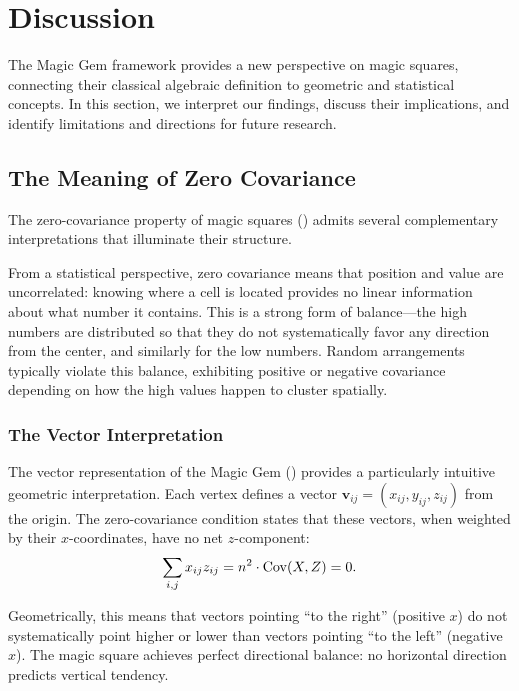 \section{Discussion}
\label{sec:discussion}

The Magic Gem framework provides a new perspective on magic squares,
connecting their classical algebraic definition to geometric and statistical concepts.
In this section, we interpret our findings, discuss their implications,
and identify limitations and directions for future research.

\subsection{The Meaning of Zero Covariance}

The zero-covariance property of magic squares () 
admits several complementary interpretations that illuminate their structure.

From a statistical perspective, zero covariance means that position and value are uncorrelated:
knowing where a cell is located provides no linear information about what number it contains.
This is a strong form of balance---the high numbers are distributed so that they do not systematically 
favor any direction from the center, and similarly for the low numbers.
Random arrangements typically violate this balance, exhibiting positive or negative covariance
depending on how the high values happen to cluster spatially.

\subsubsection{The Vector Interpretation}

The vector representation of the Magic Gem () provides a particularly 
intuitive geometric interpretation.
Each vertex defines a vector $\mathbf{v}_{ij} = (x_{ij}, y_{ij}, z_{ij})$ from the origin.
The zero-covariance condition states that these vectors, when weighted by their $x$-coordinates, 
have no net $z$-component:
\[
\sum_{i,j} x_{ij} z_{ij} = n^2 \cdot \mathrm{Cov}(X,Z) = 0.
\]

Geometrically, this means that vectors pointing ``to the right'' (positive $x$) 
do not systematically point higher or lower than vectors pointing ``to the left'' (negative $x$).
The magic square achieves perfect directional balance: 
no horizontal direction predicts vertical tendency.

